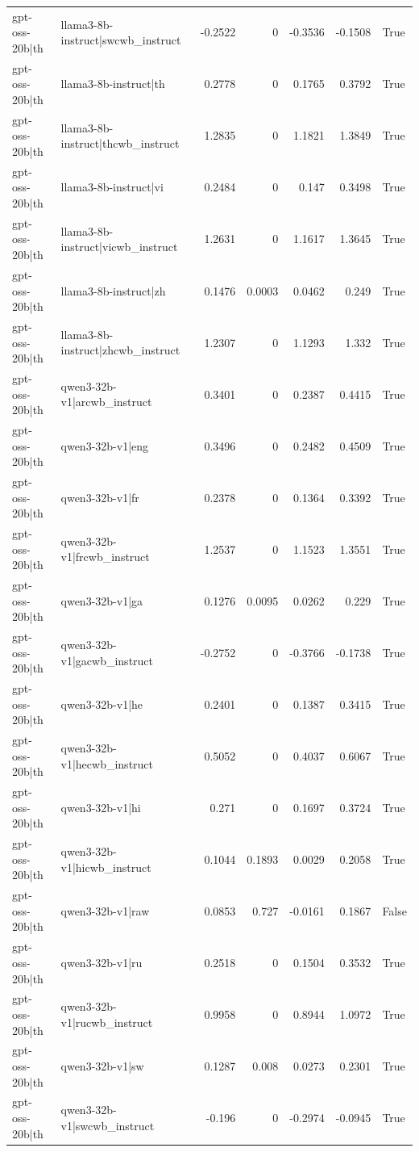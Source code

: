 \begin{table}
\begin{tabular}{l l r r r r l}
gpt-oss-20b|th & llama3-8b-instruct|swcwb_instruct & -0.2522 & 0 & -0.3536 & -0.1508 & True \\
gpt-oss-20b|th & llama3-8b-instruct|th & 0.2778 & 0 & 0.1765 & 0.3792 & True \\
gpt-oss-20b|th & llama3-8b-instruct|thcwb_instruct & 1.2835 & 0 & 1.1821 & 1.3849 & True \\
gpt-oss-20b|th & llama3-8b-instruct|vi & 0.2484 & 0 & 0.147 & 0.3498 & True \\
gpt-oss-20b|th & llama3-8b-instruct|vicwb_instruct & 1.2631 & 0 & 1.1617 & 1.3645 & True \\
gpt-oss-20b|th & llama3-8b-instruct|zh & 0.1476 & 0.0003 & 0.0462 & 0.249 & True \\
gpt-oss-20b|th & llama3-8b-instruct|zhcwb_instruct & 1.2307 & 0 & 1.1293 & 1.332 & True \\
gpt-oss-20b|th & qwen3-32b-v1|arcwb_instruct & 0.3401 & 0 & 0.2387 & 0.4415 & True \\
gpt-oss-20b|th & qwen3-32b-v1|eng & 0.3496 & 0 & 0.2482 & 0.4509 & True \\
gpt-oss-20b|th & qwen3-32b-v1|fr & 0.2378 & 0 & 0.1364 & 0.3392 & True \\
gpt-oss-20b|th & qwen3-32b-v1|frcwb_instruct & 1.2537 & 0 & 1.1523 & 1.3551 & True \\
gpt-oss-20b|th & qwen3-32b-v1|ga & 0.1276 & 0.0095 & 0.0262 & 0.229 & True \\
gpt-oss-20b|th & qwen3-32b-v1|gacwb_instruct & -0.2752 & 0 & -0.3766 & -0.1738 & True \\
gpt-oss-20b|th & qwen3-32b-v1|he & 0.2401 & 0 & 0.1387 & 0.3415 & True \\
gpt-oss-20b|th & qwen3-32b-v1|hecwb_instruct & 0.5052 & 0 & 0.4037 & 0.6067 & True \\
gpt-oss-20b|th & qwen3-32b-v1|hi & 0.271 & 0 & 0.1697 & 0.3724 & True \\
gpt-oss-20b|th & qwen3-32b-v1|hicwb_instruct & 0.1044 & 0.1893 & 0.0029 & 0.2058 & True \\
gpt-oss-20b|th & qwen3-32b-v1|raw & 0.0853 & 0.727 & -0.0161 & 0.1867 & False \\
gpt-oss-20b|th & qwen3-32b-v1|ru & 0.2518 & 0 & 0.1504 & 0.3532 & True \\
gpt-oss-20b|th & qwen3-32b-v1|rucwb_instruct & 0.9958 & 0 & 0.8944 & 1.0972 & True \\
gpt-oss-20b|th & qwen3-32b-v1|sw & 0.1287 & 0.008 & 0.0273 & 0.2301 & True \\
gpt-oss-20b|th & qwen3-32b-v1|swcwb_instruct & -0.196 & 0 & -0.2974 & -0.0945 & True \\

\end{tabular}
\end{table}
